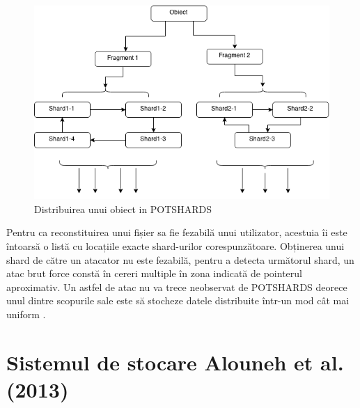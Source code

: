 \documentclass[oneside, 12pt]{book}
\begin{document}
\begin{figure}
	\begin{center}
	\includegraphics[width=12cm]{img/POTSHARDS.png}    %
	\caption{Distribuirea unui obiect in POTSHARDS}
	\label{fig:potshards-layers}
	\bigskip
	\end{center}
\end{figure}

Pentru ca reconstituirea unui fișier sa fie fezabilă unui utilizator, acestuia îi este întoarsă o listă cu locațiile exacte shard-urilor corespunzătoare.
Obținerea unui shard de către un atacator nu este fezabilă, pentru a detecta următorul shard, un atac brut force constă în cereri multiple în zona indicată de pointerul aproximativ. Un astfel de atac nu va trece neobservat de POTSHARDS deorece unul dintre scopurile sale este să stocheze datele distribuite într-un mod cât mai uniform \cite{SGMV:2009}.



\section{Sistemul de stocare Alouneh et al. (2013)}
\label{sec:desc_alouneh}
\end{document}
